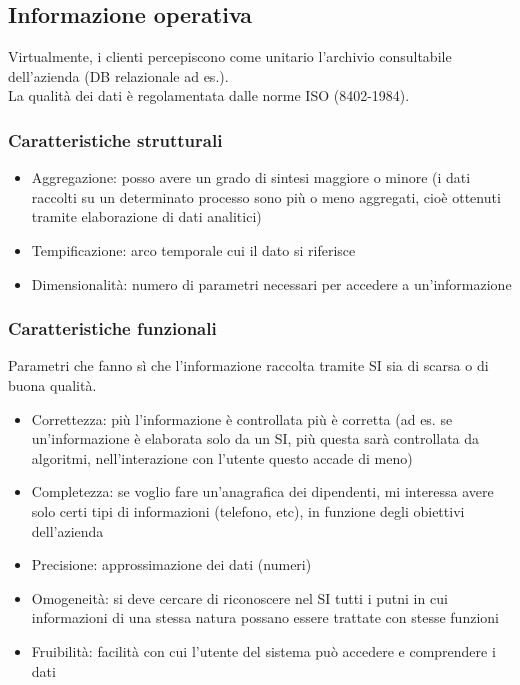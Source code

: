 \subsection{Informazione operativa}
\label{sub:Informazione operativa}
Virtualmente, i clienti percepiscono come unitario l'archivio consultabile
dell'azienda (DB relazionale ad es.).\\
La qualit\`a dei dati \`e regolamentata dalle norme ISO (8402-1984).
\subsubsection{Caratteristiche strutturali}
\label{subs:Caratteristiche strutturali}
\begin{itemize}
  \item Aggregazione: posso avere un grado di sintesi maggiore o minore
  (i dati raccolti su un determinato processo sono pi\`u o meno aggregati,
  cio\`e ottenuti tramite elaborazione di dati analitici)
  \item Tempificazione: arco temporale cui il dato si riferisce
  \item Dimensionalit\`a: numero di parametri necessari per accedere
  a un'informazione
\end{itemize}
\subsubsection{Caratteristiche funzionali}
\label{subs:Caratteristiche funzionali}
Parametri che fanno s\`i che l'informazione raccolta tramite SI sia di scarsa
o di buona qualit\`a.
\begin{itemize}
  \item Correttezza: pi\`u l'informazione \`e controllata pi\`u \`e corretta
  (ad es. se un'informazione \`e elaborata solo da un SI, pi\`u questa sar\`a
  controllata da algoritmi, nell'interazione con l'utente questo accade di meno)
  \item Completezza: se voglio fare un'anagrafica dei dipendenti, mi interessa avere solo certi
  tipi di informazioni (telefono, etc), in funzione degli obiettivi dell'azienda
  \item Precisione: approssimazione dei dati (numeri)
  \item Omogeneit\`a: si deve cercare di riconoscere nel SI tutti i putni in
  cui informazioni di una stessa natura possano essere trattate con stesse funzioni
  \item Fruibilit\`a: facilit\`a con cui l'utente del sistema pu\`o accedere e comprendere
  i dati
\end{itemize}
